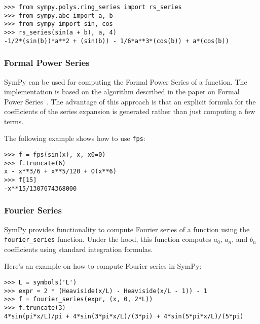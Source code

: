 \begin{verbatim}
>>> from sympy.polys.ring_series import rs_series
>>> from sympy.abc import a, b
>>> from sympy import sin, cos
>>> rs_series(sin(a + b), a, 4)
-1/2*(sin(b))*a**2 + (sin(b)) - 1/6*a**3*(cos(b)) + a*(cos(b))
\end{verbatim}

\subsubsection{Formal Power Series}

SymPy can be used for computing the Formal Power Series of a function.
The implementation is based on the algorithm described in the paper on
Formal Power Series~\cite{Gruntz93formalpower}.  The advantage of this approach is
that an explicit formula for the coefficients of the series expansion is generated
rather than just computing a few terms.

The following example shows how to use \texttt{fps}:

\begin{verbatim}
>>> f = fps(sin(x), x, x0=0)
>>> f.truncate(6)
x - x**3/6 + x**5/120 + O(x**6)
>>> f[15]
-x**15/1307674368000
\end{verbatim}

\subsubsection{Fourier Series}

SymPy provides functionality to compute Fourier series of a function using the
\texttt{fourier\_series} function. Under the hood, this function computes $a_0$,
$a_n$, and $b_n$ coefficients using standard integration formulas.

Here's an example on how to compute Fourier series in SymPy:

\begin{verbatim}
>>> L = symbols('L')
>>> expr = 2 * (Heaviside(x/L) - Heaviside(x/L - 1)) - 1
>>> f = fourier_series(expr, (x, 0, 2*L))
>>> f.truncate(3)
4*sin(pi*x/L)/pi + 4*sin(3*pi*x/L)/(3*pi) + 4*sin(5*pi*x/L)/(5*pi)
\end{verbatim}
